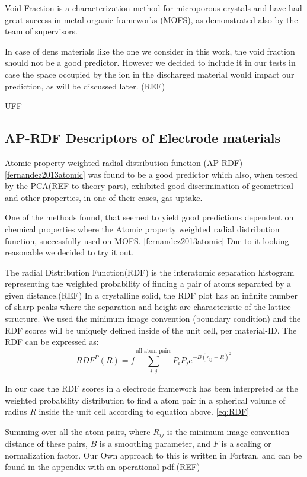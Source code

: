	Void Fraction is a characterization method for microporous crystals and have had great success in metal organic frameworks (MOFS), as demonstrated also by the team of supervisors.
	
	In case of dens materials like the one we consider in this work, the void fraction should not be a good predictor. However we decided to include it in our tests in case the space occupied by the ion in the discharged material would impact our prediction, as will be discussed later. (REF)


UFF \cite{rappe1992uff}

\subsection{AP-RDF Descriptors of Electrode materials}

	Atomic property weighted radial distribution function (AP-RDF)\ref{fernandez2013atomic} was found to be a good predictor which also, when tested by the PCA(REF to theory part), exhibited good discrimination of geometrical and other properties, in one of their cases, gas uptake.
	
	One of the methods found, that seemed to yield good predictions dependent on chemical properties where the Atomic property weighted radial distribution function, successfully used on MOFS. \ref{fernandez2013atomic} Due to it looking reasonable we decided to try it out.

	The radial Distribution Function(RDF) is the interatomic separation histogram representing the weighted probability of finding a pair of atoms separated by a given distance.(REF) In a crystalline solid, the RDF plot has an infinite number of sharp peaks where the separation and height are characteristic of the lattice structure. We used the minimum image convention (boundary condition) and the RDF scores will be uniquely defined inside of the unit cell, per material-ID. The RDF can be expressed as:
\begin{equation}\label{eq:RDF}
RDF^P(R) = f \sum^{\text{all atom pairs}}_{i,j} P_i P_j e^{-B(r_{ij} - R)^2}
\end{equation}

In our case the RDF scores in a electrode framework has been interpreted as the weighted probability distribution to find a atom pair in a spherical volume of radius $R$ inside the unit cell according to equation above. \ref{eq:RDF}

Summing over all the atom pairs, where $R_{ij}$ is the minimum image convention distance of these pairs, $B$ is a smoothing parameter, and $F$ is a scaling or normalization factor. Our Own approach to this is written in Fortran, and can be found in the appendix with an operational pdf.(REF)

